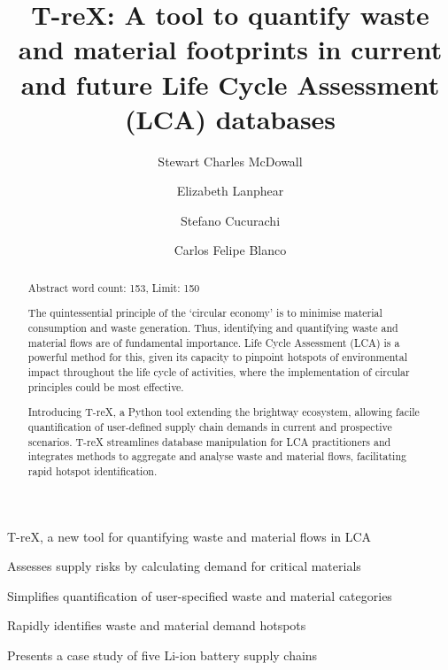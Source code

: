\documentclass[review,3p,authoryear]{elsarticle}
\newcommand{\cbox}[1]{
    \begin{tcolorbox}[hbox, colback=red!5!white, colframe=red!65!black, boxrule=0.25pt, boxsep=2pt, left=2pt, right=2pt, top=1pt, bottom=1pt]
        \small\sffamily #1
    \end{tcolorbox}
}
\begin{document}
    \begin{highlights}
        \item T-reX, a new tool for quantifying waste and material flows in LCA
        \item Assesses supply risks by calculating demand for critical materials
        \item Simplifies quantification of user-specified waste and material categories
        \item Rapidly identifies waste and material demand hotspots
        \item Presents a case study of five Li-ion battery supply chains
    \end{highlights}


\begin{frontmatter}

    \title{T-reX: A tool to quantify waste and material footprints in current and future Life Cycle Assessment (LCA) databases}
    \author[1]{Stewart Charles McDowall}
    \author[1]{Elizabeth Lanphear}
    \author[1]{Stefano Cucurachi}
    \author[1]{Carlos Felipe Blanco}



    \begin{abstract}
        \cbox{Abstract word count: 153, Limit: 150}
        The quintessential principle of the `circular economy' is to minimise material consumption and waste generation.
        Thus, identifying and quantifying waste and material flows are of fundamental importance. Life Cycle Assessment (LCA) is a powerful method for this, given its capacity to pinpoint hotspots of environmental impact throughout the life cycle of activities, where the implementation of circular principles could be most effective.

        Introducing T-reX, a Python tool extending the brightway ecosystem, allowing facile quantification of user-defined supply chain demands in current and prospective scenarios. T-reX streamlines database manipulation for LCA practitioners and integrates methods to aggregate and analyse waste and material flows, facilitating rapid hotspot identification.


\end{abstract}
\end{frontmatter}
\end{document}
